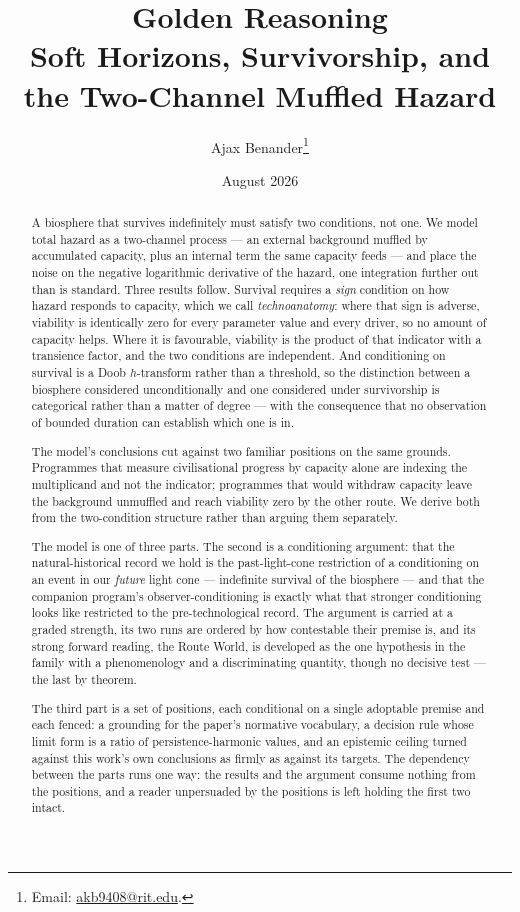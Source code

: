 \documentclass[11pt]{article}
\title{Golden Reasoning\\[4pt]
\large Soft Horizons, Survivorship, and the Two-Channel Muffled Hazard}
\author{Ajax Benander\thanks{Email: \href{mailto:akb9408@rit.edu}{akb9408@rit.edu}.}}
\date{August 2026}
\numberwithin{equation}{section}
\theoremstyle{plain}
\theoremstyle{definition}
\theoremstyle{remark}
\begin{document}
\maketitle

\begin{abstract}\small
\noindent A biosphere that survives indefinitely must satisfy two
conditions, not one. We model total hazard as a two-channel process ---
an external background muffled by accumulated capacity, plus an internal
term the same capacity feeds --- and place the noise on the negative
logarithmic derivative of the hazard, one integration further out than
is standard. Three results follow. Survival requires a \emph{sign}
condition on how hazard responds to capacity, which we call
\emph{technoanatomy}: where that sign is adverse, viability is
identically zero for every parameter value and every driver, so no
amount of capacity helps. Where it is favourable, viability is the
product of that indicator with a transience factor, and the two
conditions are independent. And conditioning on survival is a Doob
$h$-transform rather than a threshold, so the distinction between a
biosphere considered unconditionally and one considered under
survivorship is categorical rather than a matter of degree --- with the
consequence that no observation of bounded duration can establish which
one is in.

The model's conclusions cut against two familiar positions on the same
grounds. Programmes that measure civilisational progress by capacity
alone are indexing the multiplicand and not the indicator; programmes
that would withdraw capacity leave the background unmuffled and reach
viability zero by the other route. We derive both from the two-condition
structure rather than arguing them separately.

The model is one of three parts. The
second is a conditioning argument: that the natural-historical record we
hold is the past-light-cone restriction of a conditioning on an event in
our \emph{future} light cone --- indefinite survival of the biosphere ---
and that the companion program's observer-conditioning is exactly what
that stronger conditioning looks like restricted to the pre-technological
record. The argument is carried at a graded strength, its two runs are
ordered by how contestable their premise is, and its strong forward
reading, the Route World, is developed as the one hypothesis in the
family with a phenomenology and a discriminating quantity, though no
decisive test --- the last by theorem.

The third part is a set of positions, each conditional on a single
adoptable premise and each fenced: a grounding for the paper's normative
vocabulary, a decision rule whose limit form is a ratio of
persistence-harmonic values, and an epistemic ceiling turned against this
work's own conclusions as firmly as against its targets. The dependency
between the parts runs one way: the results and the argument consume
nothing from the positions, and a reader unpersuaded by the positions is
left holding the first two intact.
\end{abstract}
\end{document}
